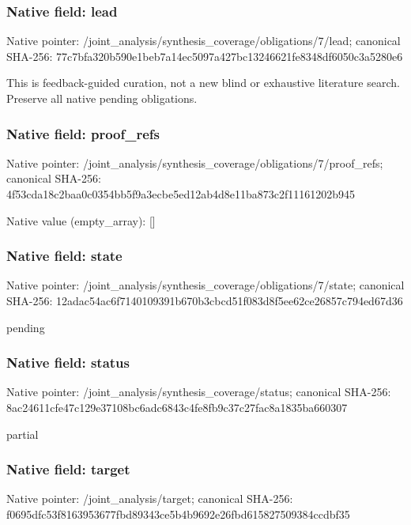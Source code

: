 \documentclass[10pt,a4paper]{article}
\begin{document}
\subsubsection{Native field: lead}
Native pointer: /joint\_\allowbreak{}analysis/synthesis\_\allowbreak{}coverage/obligations/7/lead; canonical SHA-256: 77c7bfa320b590e1beb7a14ec5097a427bc13246621fe8348df6050c3a5280e6

\begingroup\raggedright\sloppy This is feedback-guided curation,\allowbreak{} not a new blind or exhaustive literature search. Preserve all native pending obligations.\par\endgroup

\subsubsection{Native field: proof\_\allowbreak{}refs}
Native pointer: /joint\_\allowbreak{}analysis/synthesis\_\allowbreak{}coverage/obligations/7/proof\_\allowbreak{}refs; canonical SHA-256: 4f53cda18c2baa0c0354bb5f9a3ecbe5ed12ab4d8e11ba873c2f11161202b945

Native value (empty\_\allowbreak{}array): []

\subsubsection{Native field: state}
Native pointer: /joint\_\allowbreak{}analysis/synthesis\_\allowbreak{}coverage/obligations/7/state; canonical SHA-256: 12adac54ac6f7140109391b670b3cbcd51f083d8f5ee62ce26857c794ed67d36

\begingroup\raggedright\sloppy pending\par\endgroup

\subsubsection{Native field: status}
Native pointer: /joint\_\allowbreak{}analysis/synthesis\_\allowbreak{}coverage/status; canonical SHA-256: 8ac24611cfe47c129e37108bc6adc6843c4fe8fb9c37c27fac8a1835ba660307

\begingroup\raggedright\sloppy partial\par\endgroup

\subsubsection{Native field: target}
Native pointer: /joint\_\allowbreak{}analysis/target; canonical SHA-256: f0695dfc53f8163953677fbd89343ce5b4b9692e26fbd615827509384ccdbf35
\end{document}
